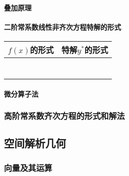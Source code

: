 \documentclass[
]{article}
\begin{document}
\hypertarget{ux53e0ux52a0ux539fux7406}{%
\paragraph{叠加原理}\label{ux53e0ux52a0ux539fux7406}}

\hypertarget{ux4e8cux9636ux5e38ux7cfbux6570ux7ebfux6027ux975eux9f50ux6b21ux65b9ux7a0bux7279ux89e3ux7684ux5f62ux5f0f}{%
\paragraph{二阶常系数线性非齐次方程特解的形式}\label{ux4e8cux9636ux5e38ux7cfbux6570ux7ebfux6027ux975eux9f50ux6b21ux65b9ux7a0bux7279ux89e3ux7684ux5f62ux5f0f}}

\begin{longtable}[]{@{}ll@{}}
\toprule
\(f(x)\)的形式 & 特解\(y^{*}\)的形式 \\
\midrule
\endhead
& \\
& \\
& \\
& \\
& \\
& \\
& \\
\bottomrule
\end{longtable}

\hypertarget{ux5faeux5206ux7b97ux5b50ux6cd5}{%
\paragraph{微分算子法}\label{ux5faeux5206ux7b97ux5b50ux6cd5}}

\hypertarget{ux9ad8ux9636ux5e38ux7cfbux6570ux9f50ux6b21ux65b9ux7a0bux7684ux5f62ux5f0fux548cux89e3ux6cd5}{%
\subsubsection{高阶常系数齐次方程的形式和解法}\label{ux9ad8ux9636ux5e38ux7cfbux6570ux9f50ux6b21ux65b9ux7a0bux7684ux5f62ux5f0fux548cux89e3ux6cd5}}

\hypertarget{ux7a7aux95f4ux89e3ux6790ux51e0ux4f55}{%
\subsection{空间解析几何}\label{ux7a7aux95f4ux89e3ux6790ux51e0ux4f55}}

\hypertarget{ux5411ux91cfux53caux5176ux8fd0ux7b97}{%
\subsubsection{向量及其运算}\label{ux5411ux91cfux53caux5176ux8fd0ux7b97}}
\end{document}
